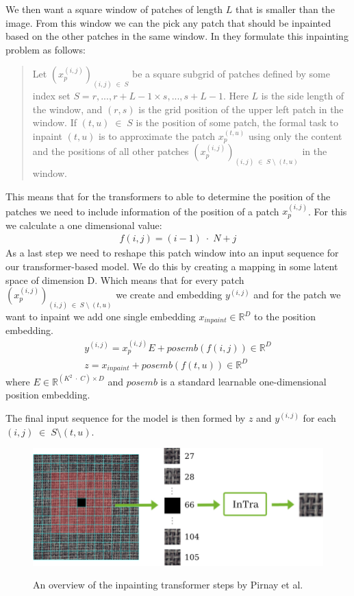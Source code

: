 We then want a square window of patches of length $L$ that is smaller than the image. From this window we can the pick any patch that should be inpainted based on the other patches in the same window. In \cite{pirnay_inpainting_2021} they formulate this inpainting problem as follows:

\begin{quote}
Let $(x_p^{(i,j)})_{(i,j) \;\in\; S}$ be a square subgrid of patches defined by some index set $S = {r,...,r+L-1} \times {s,...,s+L-1}$. Here $L$ is the side length of the window, and $(r,s)$ is the grid position of the upper left patch in the window. If $(t, u) \;\in\; S$ is the position of some patch, the formal task to inpaint $(t,u)$ is to approximate the patch $x_p^{(t,u)}$ using only the content and the positions of all other patches $(x_p^{(i,j)})_{(i,j) \;\in\; S \;\setminus\; {(t,u)}}$ in the window.
\end{quote}

This means that for the transformers to able to determine the position of the patches we need to include information of the position of a patch $x_p^{(i,j)}$. For this we calculate a one dimensional value:
%
\begin{align}
f(i,j) = (i-1) \;\cdot\; N + j 
\end{align}
%
As a last step we need to reshape this patch window into an input sequence for our transformer-based model. We do this by creating a mapping in some latent space of dimension D. Which means that for every patch $(x_p^{(i,j)})_{(i,j) \;\in\; S \;\setminus\; {(t,u)}}$ we create and embedding $y^(i,j)$ and for the patch we want to inpaint we add one single embedding $x_{inpaint} \in \mathbb{R}^D$ to the position embedding.
%
\begin{align}
y^{(i,j)} = x_p^{(i,j)}E + posemb(f(i, j)) \in \mathbb{R}^D\\
z = x_{inpaint} + posemb(f(t, u)) \in \mathbb{R}^D
\end{align}
%
where $E \in \mathbb{R}^{(K^2 \;\cdot\; C) \times D}$ and $posemb$ is a standard learnable one-dimensional position embedding.

The final input sequence for the model is then formed by $z$ and $y^{(i, j)}$ for each $(i, j) \;\in\; S \setminus {(t,u)}$.

\begin{figure}[ht!]
\caption{An overview of the inpainting transformer steps by Pirnay et al. \cite{pirnay_inpainting_2021}}
\centering
\includegraphics[width=\textwidth]{imgs/intra-overview.png}
\label{fig:experimental-setup:intra-overview}
\end{figure}

